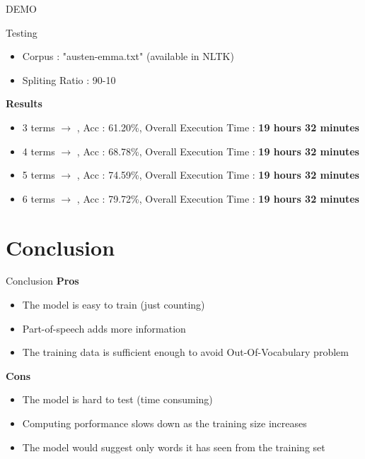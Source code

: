 \documentclass{beamer}
\begin{document}
\begin{frame}
    \centering
    \Huge DEMO
\end{frame}
\begin{frame}{Testing}
    \begin{itemize}
        \item Corpus : "austen-emma.txt" (available in NLTK)
        \item Spliting Ratio : 90-10
    \end{itemize}
    \textbf{Results}\\
    \begin{itemize}
        \item 3 terms $\rightarrow$ , Acc : 61.20\%, Overall Execution Time : \textbf{19 hours 32 minutes}
        \item 4 terms $\rightarrow$ , Acc : 68.78\%, Overall Execution Time : \textbf{19 hours 32 minutes}
        \item 5 terms $\rightarrow$ , Acc : 74.59\%, Overall Execution Time : \textbf{19 hours 32 minutes}
        \item 6 terms $\rightarrow$ , Acc : 79.72\%, Overall Execution Time : \textbf{19 hours 32 minutes}
    \end{itemize}
\end{frame}

\section{Conclusion}
\begin{frame}{Conclusion}
    \textbf{Pros}\\
    \begin{itemize}
        \item The model is easy to train (just counting)
        \item Part-of-speech adds more information
        \item The training data is sufficient enough to avoid Out-Of-Vocabulary problem
    \end{itemize}
    \textbf{Cons}\\
    \begin{itemize}
        \item The model is hard to test (time consuming)
        \item Computing porformance slows down as the training size increases
        \item The model would suggest only words it has seen from the training set
    \end{itemize}
\end{frame}
\end{document}
